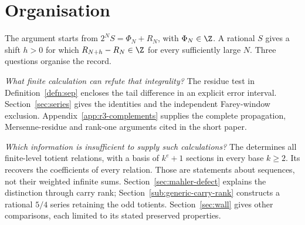 \maketitle

\paperprovenance

\begin{abstract}
Rationality of $S=\sum_{n\ge1}\varphi(n)2^{-n}$ forces a positive
shift for which every sufficiently late difference of scaled tails
is an integer. We develop finite residue tests for a failure of this
integrality and prove their completeness and propagation laws.
The tests yield a finite denominator exclusion, but their required
supply at arbitrarily large indices remains unproved. Rational
comparison sequences explain why coefficient rank, finite data and
specified analytic properties do not supply it. A first-harmonic
route isolates the remaining weighted cancellation estimate; its
group-mean bound is recorded with a prime-number-theorem input.
The irrationality of $S$ remains open.
\end{abstract}

\section*{Organisation}
The argument starts from $2^NS=\Phi_N+R_N$, with $\Phi_N\in\Z$.
A rational $S$ gives a shift $h>0$ for which $R_{N+h}-R_N\in\Z$
for every sufficiently large $N$. Three questions organise the record.

\emph{What finite calculation can refute that integrality?}
The residue test in Definition~\ref{defn:sep} encloses the tail
difference in an explicit error interval. Section~\ref{sec:series}
gives the identities and the independent Farey-window exclusion.
Appendix~\ref{app:r3-complements} supplies the complete propagation,
Mersenne-residue and rank-one arguments cited in the short paper.

\emph{Which information is insufficient to supply such calculations?}
The  determines all finite-level
totient relations, with a basis of $k^e+1$ sections in every base
$k\ge2$. Its 
recovers the coefficients of every relation. Those are statements
about sequences, not their weighted infinite sums.
Section~\ref{sec:mahler-defect} explains the distinction through
carry rank; Section~\ref{sub:generic-carry-rank} constructs a rational
$5/4$ series retaining the odd totients. Section~\ref{sec:wall}
gives other comparisons, each limited to its stated preserved properties.

